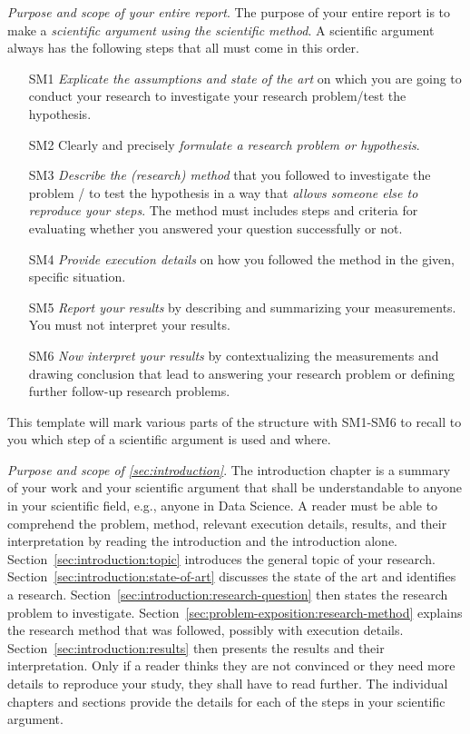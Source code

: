\documentclass[
  fontsize=10pt
  numbers=noenddot,
  english,  %
  paper=a5,
  twoside,  %
  DIV=calc,
  headings=small,
  bibliography=totoc,
  listof=totoc,
  draft=false
]{scrbook}
\theoremstyle{break}
\begin{document}
\emph{Purpose and scope of your entire report}. The purpose of your entire report is to make a \emph{scientific argument using the scientific method}. A scientific argument always has the following steps that all must come in this order.
%
\begin{itemize}
    \item[SM1] \emph{Explicate the assumptions and state of the art} on which you are going to conduct your research to investigate your research problem/test the hypothesis.
    \item[SM2] Clearly and precisely \emph{formulate a research problem or hypothesis}.
    \item[SM3] \emph{Describe the (research) method} that you followed to investigate the problem / to test the hypothesis in a way that \emph{allows someone else to reproduce your steps}. The method must includes steps and criteria for evaluating whether you answered your question successfully or not.
    \item[SM4] \emph{Provide execution details} on how you followed the method in the given, specific situation.
    \item[SM5] \emph{Report your results} by describing and summarizing your measurements. You must not interpret your results.
    \item[SM6] \emph{Now interpret your results} by contextualizing the measurements and drawing conclusion that lead to answering your research problem or defining further follow-up research problems.
\end{itemize}
%
This template will mark various parts of the structure with SM1-SM6 to recall to you which step of a scientific argument is used and where.

\emph{Purpose and scope of \cref{sec:introduction}}. The introduction chapter is a summary of your work and your scientific argument that shall be understandable to anyone in your scientific field, e.g., anyone in Data Science. A reader must be able to comprehend the problem, method, relevant execution details, results, and their interpretation by reading the introduction and the introduction alone. Section~\ref{sec:introduction:topic} introduces the general topic of your research. Section~\ref{sec:introduction:state-of-art} discusses the state of the art and identifies a research. Section~\ref{sec:introduction:research-question} then states the research problem to investigate. Section~\ref{sec:problem-exposition:research-method} explains the research method that was followed, possibly with execution details. Section~\ref{sec:introduction:results} then presents the results and their interpretation. Only if a reader thinks they are not convinced or they need more details to reproduce your study, they shall have to read further. The individual chapters and sections provide the details for each of the steps in your scientific argument.
\end{document}

